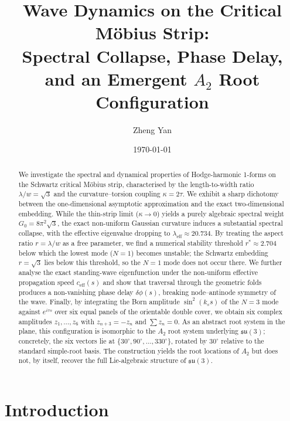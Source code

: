 \documentclass[11pt,a4paper]{article}
\title{\textbf{Wave Dynamics on the Critical M\"obius Strip:\\ Spectral Collapse, Phase Delay, and an Emergent $A_2$ Root Configuration}}
\author{Zheng Yan}
\date{\today}
\begin{document}
\maketitle

\begin{abstract}
We investigate the spectral and dynamical properties of Hodge-harmonic 1-forms on the Schwartz critical M\"obius strip, characterised by the length-to-width ratio $\lambda/w = \sqrt{3}$ and the curvature--torsion coupling $\kappa = 2\tau$. We exhibit a sharp dichotomy between the one-dimensional asymptotic approximation and the exact two-dimensional embedding. While the thin-strip limit ($\kappa \to 0$) yields a purely algebraic spectral weight $G_0 = 8\pi^2\sqrt{3}$, the exact non-uniform Gaussian curvature induces a substantial spectral collapse, with the effective eigenvalue dropping to $\lambda_{\text{eff}} \approx 20.734$. By treating the aspect ratio $r = \lambda/w$ as a free parameter, we find a numerical stability threshold $r^{*} \approx 2.704$ below which the lowest mode ($N=1$) becomes unstable; the Schwartz embedding $r=\sqrt{3}$ lies below this threshold, so the $N=1$ mode does not occur there. We further analyse the exact standing-wave eigenfunction under the non-uniform effective propagation speed $c_{\text{eff}}(s)$ and show that traversal through the geometric folds produces a non-vanishing phase delay $\delta\phi(s)$, breaking node--antinode symmetry of the wave. Finally, by integrating the Born amplitude $\sin^{2}(k_{s}s)$ of the $N=3$ mode against $e^{i\tau s}$ over six equal panels of the orientable double cover, we obtain six complex amplitudes $z_{1},\dots,z_{6}$ with $z_{n+3}=-z_{n}$ and $\sum z_{n}=0$. As an abstract root system in the plane, this configuration is isomorphic to the $A_{2}$ root system underlying $\mathfrak{su}(3)$; concretely, the six vectors lie at $\{30^\circ,90^\circ,\dots,330^\circ\}$, rotated by $30^\circ$ relative to the standard simple-root basis. The construction yields the root locations of $A_{2}$ but does not, by itself, recover the full Lie-algebraic structure of $\mathfrak{su}(3)$.
\end{abstract}

\section{Introduction}
\end{document}
